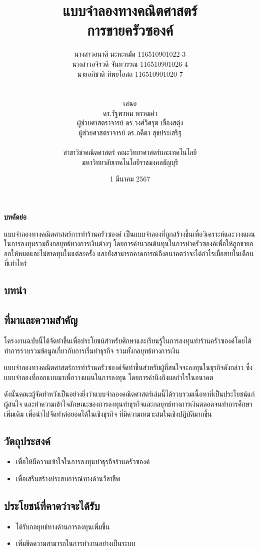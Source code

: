 \documentclass{report}
\title{แบบจำลองทางคณิตศาสตร์\\การขายครัวซองค์}
\author{    
\begin{tabular}{ll}
	นางสาวอนาตี มะหะหมัด 116510901022-3\\นางสาวอจิรวดี จันทวรรณ 116510901026-4\\นายอภิชาติ ทิพยโอสถ 116510901020-7
\end{tabular}\\ 
\\
เสนอ\\
ดร.รัฐพรหม พรหมคำ\\
ผู้ช่วยศาสตราจารย์ ดร.วงศ์วิศรุต เขื่องสตุ่ง\\
ผู้ช่วยศาสตราจารย์ ดร.ภคีตา สุขประเสริฐ\\
\\
สาขาวิชาคณิตศาสตร์ คณะวิทยาศาสตร์และเทคโนโลยี\\
มหาวิทยาลัยเทคโนโลยีราชมงคลธัญบุรี
}
\date{1 มีนาคม 2567}
\begin{document}
\maketitle
\tableofcontents
\listoftables
\listoffigures

\pagebreak

\begin{center}
\textbf{บทคัดย่อ } 
\end{center}
แบบจำลองทางคณิตศาสตร์การทำร้านครัวซองค์ เป็นแบบจําลองที่ถูกสร้างขึ้นเพื่อวิเคราะห์และวางแผนในการลงทุนรวมถึงกลยุทธ์ทางการเงินต่างๆ โดยการคํานวณต้นทุนในการทําครัวซองค์เพื่อให้ถูกขายออกให้หมดและไม่ขาดทุนในแต่ละครั้ง และยังสามารถคาดการณ์ถึงอนาคตว่าจะได้กำไรเมื่อขายในเดือนที่เท่าไหร่

\begin{center}
\chapter{บทนำ}
\end{center}
\section{ที่มาและความสำคัญ}
โครงงานฉบับนี้ได้จัดทําขึ้นเพื่อประโยชน์สําหรับศึกษาและเรียนรู้ในการลงทุนทําร้านครัวซองค์โดยได้ทําการรวบรวมข้อมูลเกี่ยวกับการเริ่มทําธุรกิจ รวมทั้งกลยุทธ์ทางการเงิน \par
แบบจําลองทางคณิตศาสตร์การทําร้านครัวซองค์จัดทําขึ้นสําหรับผู้ที่สนใจจะลงทุนในธุรกิจดังกล่าว ซึ่งแบบจำลองที่ออกแบบมาเพื่อวางแผนในการลงทุน โดยการคํานึงถึงผลกําไรในอนาคต\par
ดังนั้นคณะผู้จัดทําหวังเป็นอย่างยิ่งว่าแบบจําลองคณิตศาสตร์เล่มนี้ได้รวบรวมเนื้อหาที่เป็นประโยชน์แก่ผู้สนใจ และทําความเข้าใจลักษณะของการลงทุนทําธุรกิจและกลยุทธ์ทางการเงินตลอดจนทําการศึกษาเพิ่มเติม เพื่อนำไปจัดทำต่อยอดได้ในเชิงธุรกิจ ที่มีความเหมาะสมในเชิงปฏิบัติมากขึ้น
\section{วัตถุประสงค์}
\begin{itemize} 
	\item เพื่อให้มีความเข้าใจในการลงทุนทําธุรกิจร้านครัวซองค์
	\item เพื่อเสริมสร้างประสบการณ์ทางด้านวิชาชีพ
\end{itemize}
\section{ประโยชน์ที่คาดว่าจะได้รับ}
\begin{itemize}
    \item ได้รับกลยุทธ์ทางด้านการลงทุนเพิ่มขึ้น
    \item เพิ่มขีดความสามารถในการทำงานอย่างเป็นระบบ
\end{itemize}
\end{document}
